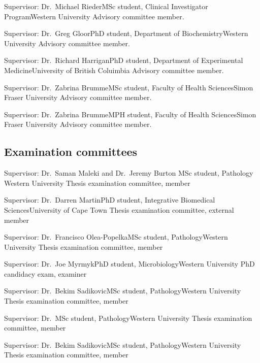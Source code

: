 {Supervisor: Dr.~Michael Rieder}{MSc student, Clinical Investigator Program}{Western University}
{Advisory committee member.} 

{Supervisor: Dr.~Greg Gloor}{PhD student, Department of Biochemistry}{Western University}
{Advisory committee member.}

{Supervisor: Dr.~Richard Harrigan}{PhD student, Department of Experimental Medicine}{University of British Coluimbia}
{Advisory committee member.}

{Supervisor: Dr.~Zabrina Brumme}{MSc student, Faculty of Health Sciences}{Simon Fraser University}
{Advisory committee member.}

{Supervisor: Dr.~Zabrina Brumme}{MPH student, Faculty of Health Sciences}{Simon Fraser University}
{Advisory committee member.}



\subsection {Examination committees} 


{Supervisor: Dr.~Saman Maleki and Dr.~Jeremy Burton}
{MSc student, Pathology}
{Western University}
{Thesis examination committee, member}

{Supervisor: Dr.~Darren Martin}{PhD student, Integrative Biomedical Sciences}{University of Cape Town}
{Thesis examination committee, external member}

{Supervisor: Dr.~Francisco Olea-Popelka}{MSc student, Pathology}{Western University}
{Thesis examination committee, member}

{Supervisor: Dr.~Joe Myrmyk}{PhD student, Microbiology}{Western University}
{PhD candidacy exam, examiner}


{Supervisor: Dr.~Bekim Sadikovic}{MSc student, Pathology}{Western University}
{Thesis examination committee, member}

{Supervisor: Dr.~}{MSc student, Pathology}{Western University}
{Thesis examination committee, member}


{Supervisor: Dr.~Bekim Sadikovic}{MSc student, Pathology}{Western University}
{Thesis examination committee, member}

